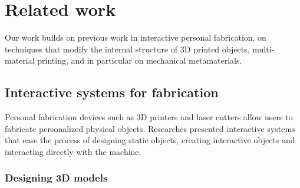 \chapter{Related work}
\label{chapter:related-work}



Our work builds on previous work in interactive personal fabrication,  on techniques that modify the internal structure of 3D printed objects, multi-material printing, and in particular on mechanical metamaterials.





\section{Interactive systems for fabrication}

Personal fabrication devices such as 3D printers and laser cutters allow users to fabricate personalized physical objects. Researches presented interactive systems that ease the process of designing static objects, creating interactive objects and interacting directly with the machine.




\subsection{Designing 3D models}



